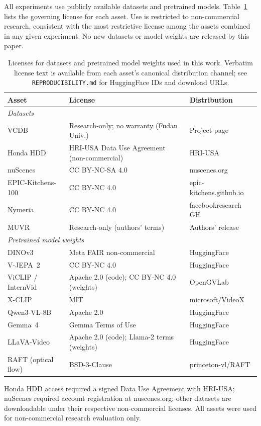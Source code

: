 \documentclass{article}
\theoremstyle{remark}
\begin{document}
All experiments use publicly available datasets and pretrained models. Table~\ref{tab:licenses} lists the governing license for each asset. Use is restricted to non-commercial research, consistent with the most restrictive license among the assets combined in any given experiment. No new datasets or model weights are released by this paper.

\begin{table}[h]
\centering
\small
\caption{Licenses for datasets and pretrained model weights used in this work. Verbatim license text is available from each asset's canonical distribution channel; see \texttt{REPRODUCIBILITY.md} for HuggingFace IDs and download URLs.}
\label{tab:licenses}
\begin{tabular}{lll}
\toprule
\textbf{Asset} & \textbf{License} & \textbf{Distribution} \\
\midrule
\multicolumn{3}{l}{\emph{Datasets}} \\
VCDB~\cite{vcdb}                      & Research-only; no warranty (Fudan Univ.)    & Project page \\
Honda HDD~\cite{honda_hdd}            & HRI-USA Data Use Agreement (non-commercial) & HRI-USA \\
nuScenes~\cite{nuscenes}              & CC BY-NC-SA 4.0                             & nuscenes.org \\
EPIC-Kitchens-100~\cite{epickitchens} & CC BY-NC 4.0                                & epic-kitchens.github.io \\
Nymeria~\cite{nymeria}                & CC BY-NC 4.0                                & facebookresearch GH \\
MUVR~\cite{muvr}                      & Research-only (authors' terms)              & Authors' release \\
\midrule
\multicolumn{3}{l}{\emph{Pretrained model weights}} \\
DINOv3~\cite{dinov3}                  & Meta FAIR non-commercial                    & HuggingFace \\
V-JEPA~2~\cite{vjepa2}                & CC BY-NC 4.0                                & HuggingFace \\
ViCLIP / InternVid~\cite{viclip}      & Apache 2.0 (code); CC BY-NC 4.0 (weights)   & OpenGVLab \\
X-CLIP~\cite{xclip}                   & MIT                                         & microsoft/VideoX \\
Qwen3-VL-8B~\cite{qwen3vl}            & Apache 2.0                                  & HuggingFace \\
Gemma~4~\cite{gemma4}                 & Gemma Terms of Use                          & HuggingFace \\
LLaVA-Video~\cite{llavavideo}         & Apache 2.0 (code); Llama-2 terms (weights)  & HuggingFace \\
RAFT (optical flow)                   & BSD-3-Clause                                & princeton-vl/RAFT \\
\bottomrule
\end{tabular}
\end{table}

Honda HDD access required a signed Data Use Agreement with HRI-USA; nuScenes required account registration at nuscenes.org; other datasets are downloadable under their respective non-commercial licenses. All assets were used for non-commercial research evaluation only.
\end{document}
